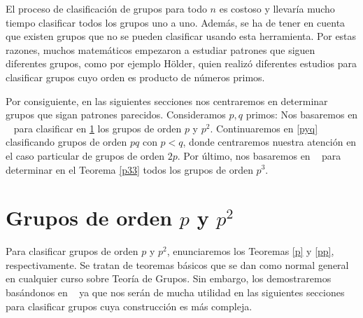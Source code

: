 \begin{remark}
El proceso de clasificación de grupos para todo $n$ es costoso y llevaría mucho tiempo clasificar todos los grupos uno a uno. Además, se ha de tener en cuenta que existen grupos que no se pueden clasificar usando esta herramienta. Por estas razones, muchos matemáticos empezaron a estudiar patrones que siguen diferentes grupos, como por ejemplo Hölder, quien realizó diferentes estudios para clasificar grupos cuyo orden es producto de números primos.

Por consiguiente, en las siguientes secciones nos centraremos en determinar grupos que sigan patrones parecidos. Consideramos $p,q$ primos: Nos basaremos en ~\cite{bullejos} para clasificar en \ref{pyp2} los grupos de orden $p$ y $p^2$.  Continuaremos en \ref{pyq} clasificando grupos de orden $pq$ con $p<q$, donde centraremos nuestra atención en el caso particular de grupos de orden $2p$. Por último, nos basaremos en ~\cite{abstractrojo} para determinar en el Teorema \ref{p33} todos los grupos de orden $p^3$.
\end{remark}

\newpage 



\iffalse
\begin{proposition} \label{dos} Sea $p$ un número primo, entonces:
\hfill
    \begin{enumerate}
        \item    Todo grupo de orden $p$ es cíclico. \label{pprimo}
    
        \item  Todo grupo de orden $p^2$ es abeliano. \label{p2}
    \end{enumerate}
    
\end{proposition}
\fi



\section{Grupos de orden $p$ y $p^2$} \label{pyp2}


Para clasificar grupos de orden $p$ y $p^2$, enunciaremos los Teoremas \ref{p} y \ref{pp}, respectivamente. Se tratan de teoremas básicos que se dan como normal general en cualquier curso sobre Teoría de Grupos. Sin embargo, los demostraremos basándonos en ~\cite{bullejos}  ya que nos serán de mucha utilidad en las siguientes secciones para clasificar grupos cuya construcción es más compleja.



